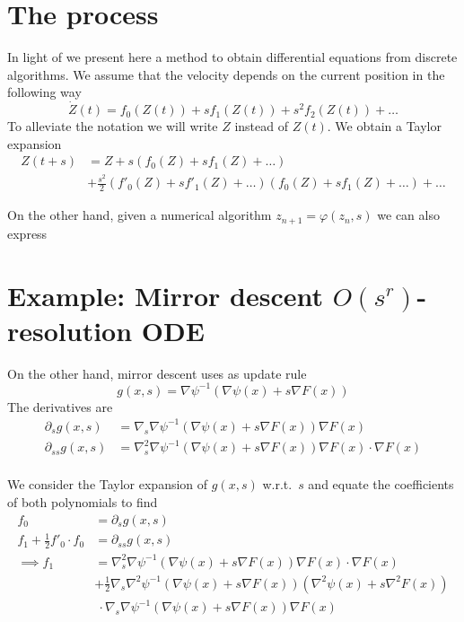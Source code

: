 \documentclass[main.tex]{subfiles}
\begin{document}
\section{The process}
In light of \cite{luResolutionODEFramework2021} we present here a method
to obtain differential equations from discrete algorithms.
We assume that the velocity depends on the current position in the following way 
\[ \dot Z(t) = f_0(Z(t)) + sf_1(Z(t)) + s^2f_2(Z(t)) + \dots \]
To alleviate the notation we will write $Z$ instead of $Z(t)$.
We obtain a Taylor expansion
\begin{align*}
	Z(t + s) & = Z + s(f_0(Z) + sf_1(Z) + \dots)                                          \\
	     & + \frac{s^2}{2}(f'_0(Z) + sf'_1(Z) + \dots)(f_0(Z) + sf_1(Z) + \dots) + \dots
\end{align*}\label{eq:taylor-x}

On the other hand, given a numerical algorithm $z_{n+1} = \varphi(z_n, s)$
we can also express 
\section{Example: Mirror descent $O(s^r)$-resolution ODE}

On the other hand, mirror descent uses as update rule
\[ g(x, s) = \nabla\psi^{-1}(\nabla\psi(x) + s \nabla F(x)) \]
The derivatives are
\begin{align*}
	\partial_s g(x, s)    & = \nabla_s \nabla \psi^{-1}(\nabla\psi(x) + s \nabla F(x))\nabla F(x)                      \\
	\partial_{ss} g(x, s) & = \nabla^2_s \nabla \psi^{-1}(\nabla\psi(x) + s \nabla F(x)) \nabla F(x) \cdot \nabla F(x) \\
\end{align*}

We consider the Taylor expansion of $g(x,s)$ w.r.t.\ $s$ and equate the coefficients of both polynomials to find
\begin{align*}
	f_0                             & = \partial_s g(x,s)                                                                                         \\
	f_1 + \frac{1}{2}f'_0 \cdot f_0 & = \partial_{ss} g(x,s)                                                                                      \\
	\implies f_1                    & = \nabla^2_s \nabla \psi^{-1}(\nabla\psi(x) + s \nabla F(x)) \nabla F(x) \cdot \nabla F(x)                  \\
	                                & + \frac{1}{2}\nabla_s \nabla^2 \psi^{-1}(\nabla \psi (x) + s \nabla F(x))(\nabla^2 \psi(x) + s\nabla^2F(x)) \\
	                                & \ \cdot  \nabla_s \nabla \psi^{-1}(\nabla\psi(x) + s \nabla F(x))\nabla F(x)
\end{align*}
\end{document}
